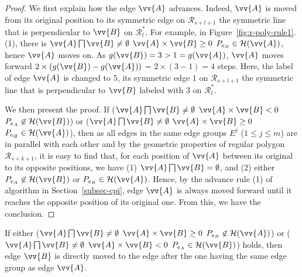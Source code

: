\begin{proof}
We first explain how the edge $\vv{A}$ advances.
Indeed, $\vv{A}$ is moved from its original position to its symmetric edge on $\mathcal{R}_{s+l+1}$ \wrt the symmetric line that is perpendicular to $\vv{B}$  on $\mathcal{R}^*_{l}$.
For example, in Figure~\ref{fig:r-poly-rule1}.(1), there is $\vv{A} \bigsqcap \vv{B} \ne \emptyset$ \And $\vv{A} \times \vv{B} \ge 0$ \And $P_{e_B} \in \mathcal{H}(\vv{A})$, hence $\vv{A}$ moves on. As $g(\vv{B})=3 > 1=g(\vv{A})$, $\vv{A}$ moves forward $2\times(g(\vv{B}) - g(\vv{A}))$ = $2\times(3-1)= 4$ steps.
Here, the label of edge $\vv{A}$ is changed to $5$, its symmetric edge $1$ on $\mathcal{R}_{s+l+1}$ \wrt the symmetric line that is perpendicular to $\vv{B}$ labeled with $3$  on $\mathcal{R}^*_{l}$.


We then present the proof.
If ($\vv{A} \bigsqcap \vv{B} \ne \emptyset$ \And $\vv{A} \times \vv{B} < 0$ \And $P_{e_A} \not \in \mathcal{H}(\vv{B})$) or ($\vv{A} \bigsqcap \vv{B} \ne \emptyset$ \And $\vv{A} \times \vv{B} \ge 0$ \And $P_{e_B} \in \mathcal{H}(\vv{A})$), then as all edges in the same edge groups $E^j$ ($1\le j\le m$) are in parallel with each other and by the geometric properties of regular polygon $\mathcal{R}_{s+k+1}$, it is easy to find that, for each position of $\vv{A}$ between its original to its opposite positions, we have (1) $\vv{A} \bigsqcap \vv{B} = \emptyset$, and (2) either $P_{e_A} \not \in \mathcal{H}(\vv{B})$ or $P_{e_B} \in \mathcal{H}(\vv{A})$. Hence, by the advance rule (1) of algorithm \cpia in Section~\ref{subsec-cpi}, edge $\vv{A}$ is always moved forward until it reaches the opposite position of its original one. From this, we have the conclusion.
\end{proof}



\begin{prop}
\label{prop-rule2}
If either ($\vv{A} \bigsqcap \vv{B} \ne \emptyset$ \And $\vv{A} \times \vv{B} \ge 0$ \And $P_{e_B} \not \in \mathcal{H}(\vv{A})$) or ($\vv{A} \bigsqcap \vv{B} \ne \emptyset$ \And $\vv{A} \times \vv{B} < 0$ \And $P_{e_A} \in \mathcal{H}(\vv{B})$) holds, then edge $\vv{B}$ is directly moved to the edge after the one having the same edge group as edge $\vv{A}$.
\end{prop}

